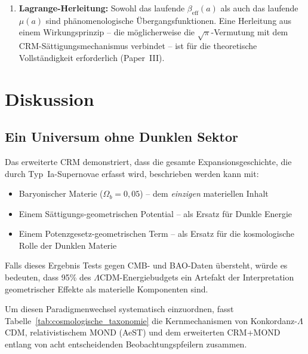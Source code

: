 \documentclass[aps,prd,twocolumn,superscriptaddress,nofootinbib,floatfix]{revtex4-2}
\begin{document}
\begin{enumerate}
\item \textbf{Lagrange-Herleitung:} Sowohl das laufende $\beta_{\mathrm{eff}}(a)$ als auch das laufende $\mu(a)$ sind phänomenologische Übergangsfunktionen. Eine Herleitung aus einem Wirkungsprinzip -- die möglicherweise die $\sqrt{\pi}$-Vermutung mit dem CRM-Sättigungsmechanismus verbindet -- ist für die theoretische Vollständigkeit erforderlich (Paper~III).
\end{enumerate}

\section{Diskussion}
\label{sec:discussion}

\subsection{Ein Universum ohne Dunklen Sektor}

Das erweiterte CRM demonstriert, dass die gesamte Expansionsgeschichte, die durch Typ~Ia-Supernovae erfasst wird, beschrieben werden kann mit:
\begin{itemize}
\item Baryonischer Materie ($\Omega_b = 0{,}05$) -- dem \textit{einzigen} materiellen Inhalt
\item Einem Sättigungs-geometrischen Potential -- als Ersatz für Dunkle Energie
\item Einem Potenzgesetz-geometrischen Term -- als Ersatz für die kosmologische Rolle der Dunklen Materie
\end{itemize}

Falls dieses Ergebnis Tests gegen CMB- und BAO-Daten übersteht, würde es bedeuten, dass 95\% des $\Lambda$CDM-Energiebudgets ein Artefakt der Interpretation geometrischer Effekte als materielle Komponenten sind.

Um diesen Paradigmenwechsel systematisch einzuordnen, fasst Tabelle~\ref{tab:cosmologische_taxonomie} die Kernmechanismen von Konkordanz-$\Lambda$CDM, relativistischem MOND (AeST) und dem erweiterten CRM+MOND entlang von acht entscheidenden Beobachtungspfeilern zusammen.
\end{document}
